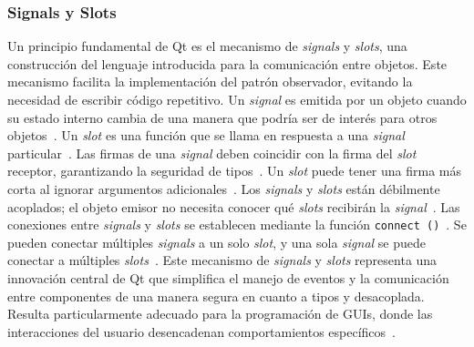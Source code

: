 \subsubsection{Signals y Slots}
Un principio fundamental de Qt es el mecanismo de \textit{signals} y \textit{slots}, una construcción del lenguaje introducida para la comunicación entre objetos. Este mecanismo facilita la implementación del patrón observador, evitando la necesidad de escribir código repetitivo. Un \textit{signal} es emitida por un objeto cuando su estado interno cambia de una manera que podría ser de interés para otros objetos~\cite{qt_mit_signals}. Un \textit{slot} es una función que se llama en respuesta a una \textit{signal} particular~\cite{qt_mit_signals}. Las firmas de una \textit{signal} deben coincidir con la firma del \textit{slot} receptor, garantizando la seguridad de tipos~\cite{qt_mit_signals}. Un \textit{slot} puede tener una firma más corta al ignorar argumentos adicionales~\cite{qt_mit_signals}. Los \textit{signals} y \textit{slots} están débilmente acoplados; el objeto emisor no necesita conocer qué \textit{slots} recibirán la \textit{signal}~\cite{qt_mit_signals}. Las conexiones entre \textit{signals} y \textit{slots} se establecen mediante la función \texttt{connect~()}~\cite{qt_mit_signals}. Se pueden conectar múltiples \textit{signals} a un solo \textit{slot}, y una sola \textit{signal} se puede conectar a múltiples \textit{slots}~\cite{qt_mit_signals}. Este mecanismo de \textit{signals} y \textit{slots} representa una innovación central de Qt que simplifica el manejo de eventos y la comunicación entre componentes de una manera segura en cuanto a tipos y desacoplada. Resulta particularmente adecuado para la programación de GUIs, donde las interacciones del usuario desencadenan comportamientos específicos~\cite{businesscloud}.

